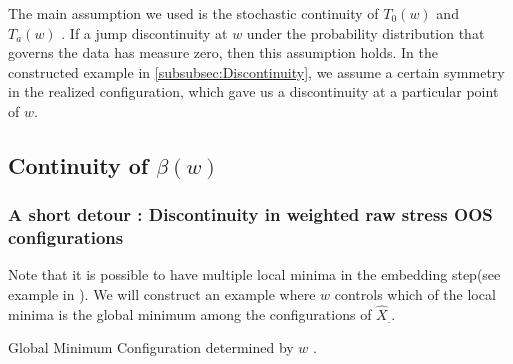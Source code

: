 \documentclass[11pt]{article} %
\begin{document}
 The main assumption we used is the stochastic continuity of $T_0(w)$ and $T_a(w)$ . If  a jump discontinuity at $w$ under the probability distribution that governs the data has measure  zero, then this assumption holds. In the constructed example in \ref{subsubsec:Discontinuity}, we assume a certain symmetry in the realized configuration, which gave us a discontinuity at a particular point of $w$. 

 
\subsection{Continuity of $\beta(w)$} 

\subsubsection{ A short detour : Discontinuity in weighted raw stress OOS configurations\label{subsubsec:Discontinuity}}

Note that it is possible to have multiple local minima in the embedding step(see example in \cite{TrossetLocalMin}). We will construct an example  where $w$ controls which of the local minima is the global minimum among the configurations of $\hat{X}_{.}$.
 
Global Minimum Configuration determined by $w$ .
\end{document}

